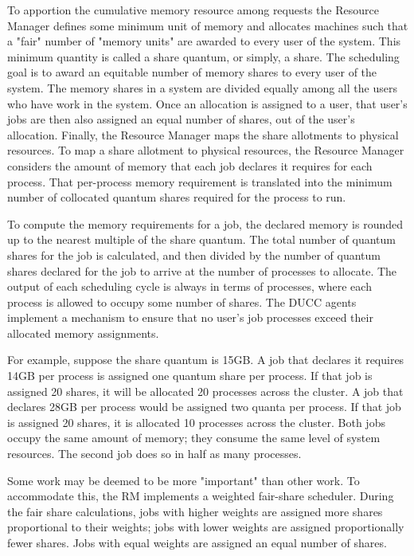     To apportion the cumulative memory resource among requests the Resource Manager
    defines some minimum unit of memory and allocates machines such that a "fair" number of "memory
    units" are awarded to every user of the system. This minimum quantity is called a share quantum,
    or simply, a share. The scheduling goal is to award an equitable number of memory shares to
    every user of the system.  The memory shares in a system are divided equally among all the users
    who have work in the system. Once an allocation is assigned to a user, that user's jobs are then
    also assigned an equal number of shares, out of the user's allocation. Finally, the Resource
    Manager maps the share allotments to physical resources.  To map a share allotment to physical
    resources, the Resource Manager considers the amount of memory that each job declares it
    requires for each process. That per-process memory requirement is translated into the minimum
    number of collocated quantum shares required for the process to run.
    
    To compute the memory requirements for a job, the declared memory is rounded up to the nearest
    multiple of the share quantum.  The total number of quantum shares for the job is calculated,
    and then divided by the number of quantum shares declared for the job to arrive at the number of
    processes to allocate.  The output of each scheduling cycle is always in terms of processes,
    where each process is allowed to occupy some number of shares. The DUCC agents implement a
    mechanism to ensure that no user's job processes exceed their allocated memory assignments.

    For example, suppose the share quantum is 15GB. A job that declares it requires 14GB per process 
    is assigned one quantum share per process. If that job is assigned 20 shares, it will be allocated 20 
    processes across the cluster. A job that declares 28GB per process would be assigned two quanta 
    per process. If that job is assigned 20 shares, it is allocated 10 processes across the cluster. Both     
    jobs occupy the same amount of memory; they consume the same level of system resources. The 
    second job does so in half as many processes.
    
    
    Some work may be deemed to be more "important" than other work. To accommodate this, the RM
    implements a weighted fair-share scheduler.  During the fair share 
    calculations, jobs with higher weights are assigned more shares proportional to their weights; jobs 
    with lower weights are assigned proportionally fewer shares. Jobs with equal weights are assigned 
    an equal number of shares. 
    
